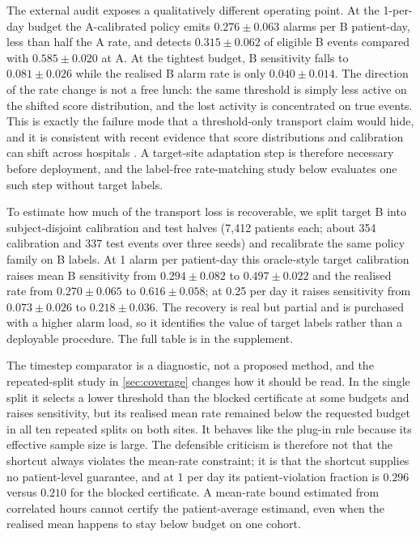 The external audit exposes a qualitatively different operating point. At the 1-per-day budget the A-calibrated policy emits $0.276\pm0.063$ alarms per B patient-day, less than half the A rate, and detects $0.315\pm0.062$ of eligible B events compared with $0.585\pm0.020$ at A. At the tightest budget, B sensitivity falls to $0.081\pm0.026$ while the realised B alarm rate is only $0.040\pm0.014$. The direction of the rate change is not a free lunch: the same threshold is simply less active on the shifted score distribution, and the lost activity is concentrated on true events. This is exactly the failure mode that a threshold-only transport claim would hide, and it is consistent with recent evidence that score distributions and calibration can shift across hospitals \citep{lu2022estimating,wu2026outofdistribution}. A target-site adaptation step is therefore necessary before deployment, and the label-free rate-matching study below evaluates one such step without target labels.

To estimate how much of the transport loss is recoverable, we split target B into subject-disjoint calibration and test halves (7,412 patients each; about 354 calibration and 337 test events over three seeds) and recalibrate the same policy family on B labels. At 1 alarm per patient-day this oracle-style target calibration raises mean B sensitivity from $0.294\pm0.082$ to $0.497\pm0.022$ and the realised rate from $0.270\pm0.065$ to $0.616\pm0.058$; at 0.25 per day it raises sensitivity from $0.073\pm0.026$ to $0.218\pm0.036$. The recovery is real but partial and is purchased with a higher alarm load, so it identifies the value of target labels rather than a deployable procedure. The full table is in the supplement.

The timestep comparator is a diagnostic, not a proposed method, and the repeated-split study in \cref{sec:coverage} changes how it should be read. In the single split it selects a lower threshold than the blocked certificate at some budgets and raises sensitivity, but its realised mean rate remained below the requested budget in all ten repeated splits on both sites. It behaves like the plug-in rule because its effective sample size is large. The defensible criticism is therefore not that the shortcut always violates the mean-rate constraint; it is that the shortcut supplies no patient-level guarantee, and at 1 per day its patient-violation fraction is $0.296$ versus $0.210$ for the blocked certificate. A mean-rate bound estimated from correlated hours cannot certify the patient-average estimand, even when the realised mean happens to stay below budget on one cohort.

